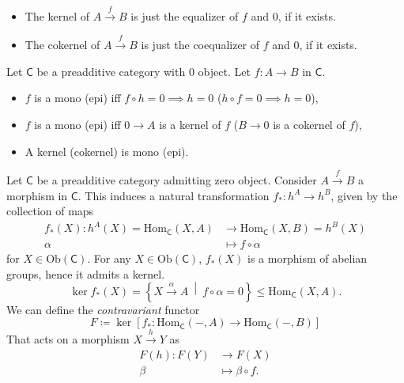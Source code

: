 \begin{rem}\leavevmode\vspace{-.2\baselineskip}
	\begin{itemize}
		\item The kernel of $A \xrightarrow{f} B$ is just the equalizer of $f$ and $0$, if it exists.
		\item The cokernel of $A \xrightarrow{f} B$ is just the coequalizer of $f$ and $0$, if it exists.
	\end{itemize}
\end{rem}

\begin{lem}
	Let $\mathsf{C}$ be a preadditive category with $0$ object.
	Let $f\colon A \to B$ in $\mathsf{C}$.
	\begin{itemize}
		\item $f$ is a mono (epi) iff $f \circ h = 0 \implies h = 0$ ($h \circ f = 0 \implies h = 0$),
		\item $f$ is a mono (epi) iff $0 \to A$ is a kernel of $f$ ($B \to 0$ is a cokernel of $f$),
		\item A kernel (cokernel) is mono (epi).
	\end{itemize}
\end{lem} 

\begin{defn}
	Let $\mathsf{C}$ be a preadditive category admitting zero object.
	Consider $A \xrightarrow{f} B$ a morphism in $\mathsf{C}$.
	This induces a natural transformation 
	$f_*\colon h^A \to h^B$, given by the collection of maps
	\begin{align}
		f_*(X)\colon h^A(X) = \mathrm{Hom}_{\mathsf{C}} \left( X, A \right) &\to \mathrm{Hom}_{\mathsf{C}} \left( X, B \right) = h^B(X) \\
		\alpha &\mapsto f \circ \alpha
	\end{align} 
	for $X \in \mathrm{Ob} \left(\mathsf{C}\right)$.
	For any $X \in \mathrm{Ob} \left(\mathsf{C}\right)$,
	$f_*(X)$ is a morphism of abelian groups, hence it admits a kernel.
	\begin{equation}
		\ker f_*(X) = \left\{ X \xrightarrow{\alpha} A  \ \middle|\ f \circ \alpha = 0\right\} \leq \mathrm{Hom}_{\mathsf{C}} \left( X, A \right)
	.\end{equation} 
	We can define the {\em contravariant} functor
	\begin{equation}
	F \coloneqq \ker \left[ f_*\colon \mathrm{Hom}_{\mathsf{C}} \left( -, A \right) \to \mathrm{Hom}_{\mathsf{C}} \left( -, B \right) \right]
	\end{equation} 
	That acts on a morphism $X \xrightarrow{h} Y$ as
	 \begin{align}
		 F(h)\colon F(Y) &\to F(X) \\
		\beta &\mapsto \beta \circ f
	.\end{align} 
\end{defn}

